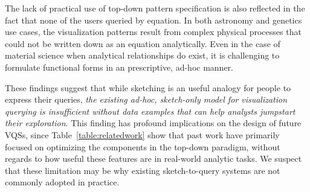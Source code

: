 \par The lack of practical use of top-down pattern specification is also reflected in the fact that none of the users queried by equation. In both astronomy and genetics use cases, the visualization patterns result from complex physical processes that could not be written down as an equation analytically. Even in the case of material science when analytical relationships do exist, it is challenging to formulate functional forms in an prescriptive, ad-hoc manner.
\par These findings suggest that while sketching is an useful analogy for people to express their queries, \emph{the existing ad-hoc, sketch-only model for visualization querying is insufficient without data examples that can help analysts jumpstart their exploration}. This finding has profound implications on the design of future VQSs, since Table~\ref{table:relatedwork} show that past work have primarily focused on optimizing the components in the top-down paradigm, without regards to how useful these features are in real-world analytic tasks.
We suspect that these limitation may be why existing sketch-to-query systems are not commonly adopted in practice. %

